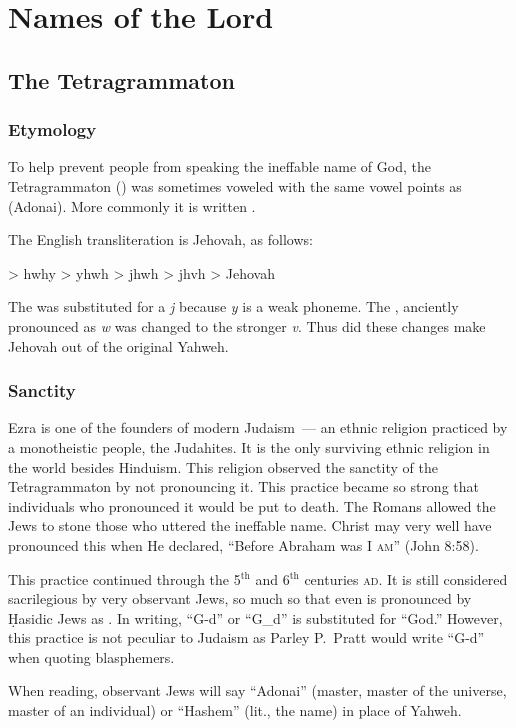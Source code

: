 \chapter{Names of the Lord}\label{app:names-of-the-lord}
\section{The Tetragrammaton}
\subsection{Etymology}
To help prevent people from speaking the ineffable name of God, the Tetragrammaton () was sometimes voweled with the same vowel points as  (Adonai). More commonly it is written .

The English transliteration is Jehovah, as follows:
\begin{center}
     > hwhy > yhwh > jhwh > jhvh > Jehovah
\end{center}
The  was substituted for a \emph{j} because \emph{y} is a weak phoneme. The , anciently pronounced as \emph{w} was changed to the stronger \emph{v}. Thus did these changes make Jehovah out of the original Yahweh.

\subsection{Sanctity}
Ezra is one of the founders of modern Judaism~--- an ethnic religion practiced by a monotheistic people, the Judahites. It is the only surviving ethnic religion in the world besides Hinduism. This religion observed the sanctity of the Tetragrammaton by not pronouncing it. This practice became so strong that individuals who pronounced it would be put to death. The Romans allowed the Jews to stone those who uttered the ineffable name. Christ may very well have pronounced this when He declared, ``Before Abraham was \textsc{I am}'' (John 8:58).

This practice continued through the 5$^\text{th}$ and 6$^\text{th}$ centuries \textsc{ad}. It is still considered sacrilegious by very observant Jews, so much so that even  is pronounced by \d{H}asidic Jews as . In writing, ``G-d'' or ``G\_{}d'' is substituted for ``God.'' However, this practice is not peculiar to Judaism as Parley P.\ Pratt would write ``G-d'' when quoting blasphemers.

When reading, observant Jews will say ``Adonai'' (master, master of the universe, master of an individual) or ``Hashem'' (lit., the name) in place of Yahweh.


